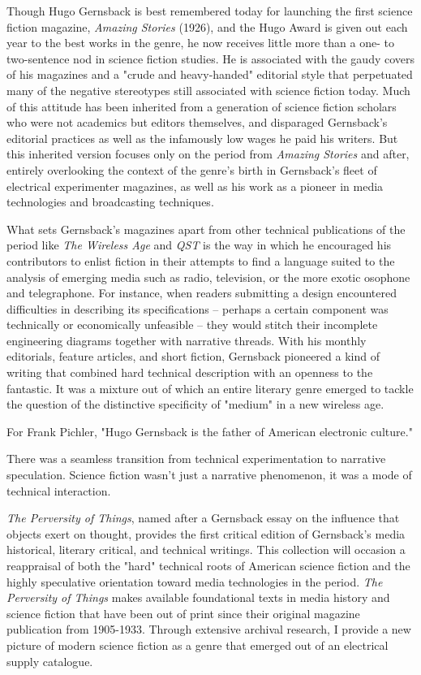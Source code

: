\documentclass{article}
\begin{document}
Though Hugo Gernsback is best remembered today for launching the first science fiction magazine, \textit{Amazing Stories} (1926), and the Hugo Award is given out each year to the best works in the genre, he now receives little more than a one- to two-sentence nod in science fiction studies.  He is associated with the gaudy covers of his magazines and a "crude and heavy-handed" editorial style that perpetuated many of the negative stereotypes still associated with science fiction today.  Much of this attitude has been inherited from a generation of science fiction scholars who were not academics but editors themselves, and disparaged Gernsback's editorial practices as well as the infamously low wages he paid his writers.  But this inherited version focuses only on the period from \textit{Amazing Stories} and after, entirely overlooking the context of the genre's birth in Gernsback's fleet of electrical experimenter magazines, as well as his work as a pioneer in media technologies and broadcasting techniques.

What sets Gernsback's magazines apart from other technical publications of the period like \textit{The Wireless Age} and \textit{QST} is the way in which he encouraged his contributors to enlist fiction in their attempts to find a language suited to the analysis of emerging media such as radio, television, or the more exotic osophone and telegraphone.  For instance, when readers submitting a design encountered difficulties in describing its specifications -- perhaps a certain component was technically or economically unfeasible -- they would stitch their incomplete engineering diagrams together with narrative threads.  With his monthly editorials, feature articles, and short fiction, Gernsback pioneered a kind of writing that combined hard technical description with an openness to the fantastic.  It was a mixture out of which an entire literary genre emerged to tackle the question of the distinctive specificity of "medium" in a new wireless age.

For Frank Pichler, "Hugo Gernsback is the father of American electronic culture."

There was a seamless transition from technical experimentation to narrative speculation.  Science fiction wasn't just a narrative phenomenon, it was a mode of technical interaction.

\textit{The Perversity of Things}, named after a Gernsback essay on the influence that objects exert on thought, provides the first critical edition of Gernsback's media historical, literary critical, and technical writings.  This collection will occasion a reappraisal of both the "hard" technical roots of American science fiction and the highly speculative orientation toward media technologies in the period.  \textit{The Perversity of Things} makes available foundational texts in media history and science fiction that have been out of print since their original magazine publication from 1905-1933.  Through extensive archival research, I provide a new picture of modern science fiction as a genre that emerged out of an electrical supply catalogue.  
\end{document}
